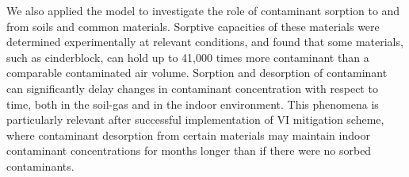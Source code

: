 We also applied the model to investigate the role of contaminant sorption to and from soils and common materials.
Sorptive capacities of these materials were determined experimentally at relevant conditions, and found that some materials, such as cinderblock, can hold up to 41,000 times more contaminant than a comparable contaminated air volume.
Sorption and desorption of contaminant can significantly delay changes in contaminant concentration with respect to time, both in the soil-gas and in the indoor environment.
This phenomena is particularly relevant after successful implementation of VI mitigation scheme, where contaminant desorption from certain materials may maintain indoor contaminant concentrations for months longer than if there were no sorbed contaminants.\par

\vfill
